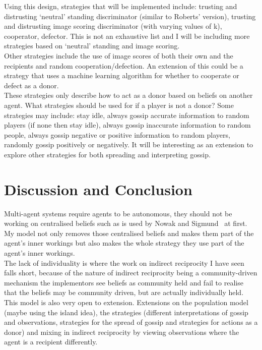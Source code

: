 \documentclass[twoside,twocolumn]{article}
\begin{document}
Using this design, strategies that will be implemented include: trusting and distrusting `neutral' standing discriminator (similar to Roberts' version), trusting and distrusting image scoring discriminator (with varying values of k), cooperator, defector. This is not an exhaustive list and I will be including more strategies based on `neutral' standing and image scoring.\\
Other strategies include the use of image scores of both their own and the recipients and random cooperation/defection. An extension of this could be a strategy that uses a machine learning algorithm for whether to cooperate or defect as a donor.\\
These strategies only describe how to act as a donor based on beliefs on another agent. What strategies should be used for if a player is not a donor? Some strategies may include: stay idle, always gossip accurate information to random players (if none then stay idle), always gossip inaccurate information to random people, always gossip negative or positive information to random players, randomly gossip positively or negatively. It will be interesting as an extension to explore other strategies for both spreading and interpreting gossip.



\section{Discussion and Conclusion}
Multi-agent systems require agents to be autonomous, they should not be working on centralised beliefs such as is used by Nowak and Sigmund~\cite{evol_indirect_image} at first. My model not only removes those centralised beliefs and makes them part of the agent's inner workings but also makes the whole strategy they use part of the agent's inner workings. \\
The lack of individuality is where the work on indirect reciprocity I have seen falls short, because of the nature of indirect reciprocity being a community-driven mechanism the implementors see beliefs as community held and fail to realise that the beliefs may be community driven, but are actually individually held.\\
This model is also very open to extension. Extensions on the population model (maybe using the island idea), the strategies (different interpretations of gossip and observations, strategies for the spread of gossip and strategies for actions as a donor) and mixing in indirect reciprocity by viewing observations where the agent is a recipient differently.




{}


\end{document}
